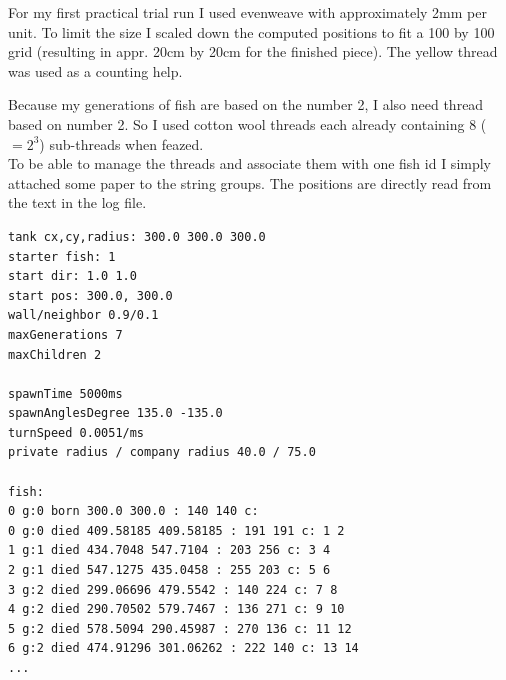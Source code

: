 \documentclass{scrartcl}
\begin{document}
\begin{minipage}[t]{0.48\textwidth}
\end{minipage}
\hspace{0.5cm}
\begin{minipage}[t]{0.48\textwidth}
    For my first practical trial run I used evenweave with approximately 2mm per unit. To limit the size I scaled down the computed positions to fit a 100 by 100 grid (resulting in appr. 20cm by 20cm for the finished piece). The yellow thread was used as a counting help.
\end{minipage}
\vspace{0.5cm}
\begin{minipage}[t]{0.48\textwidth}
\end{minipage}
\hspace{0.5cm}
\begin{minipage}[t]{0.48\textwidth}
	Because my generations of fish are based on the number 2, I also need thread based on number 2. So I used cotton wool threads each already containing 8 ($=2^3$) sub-threads when feazed.\\
	To be able to manage the threads and associate them with one fish id I simply attached some paper to the string groups. The positions are directly read from the text in the log file.
\end{minipage}
\vspace{0.5cm}

\begin{minipage}[t]{\textwidth}
\scriptsize
\begin{verbatim}
tank cx,cy,radius: 300.0 300.0 300.0
starter fish: 1
start dir: 1.0 1.0
start pos: 300.0, 300.0
wall/neighbor 0.9/0.1
maxGenerations 7
maxChildren 2

spawnTime 5000ms
spawnAnglesDegree 135.0 -135.0
turnSpeed 0.0051/ms
private radius / company radius 40.0 / 75.0

fish:
0 g:0 born 300.0 300.0 : 140 140 c: 
0 g:0 died 409.58185 409.58185 : 191 191 c: 1 2 
1 g:1 died 434.7048 547.7104 : 203 256 c: 3 4 
2 g:1 died 547.1275 435.0458 : 255 203 c: 5 6 
3 g:2 died 299.06696 479.5542 : 140 224 c: 7 8 
4 g:2 died 290.70502 579.7467 : 136 271 c: 9 10 
5 g:2 died 578.5094 290.45987 : 270 136 c: 11 12 
6 g:2 died 474.91296 301.06262 : 222 140 c: 13 14
...
\end{verbatim}
\end{minipage}
\vspace{0.5cm}
\end{document}
